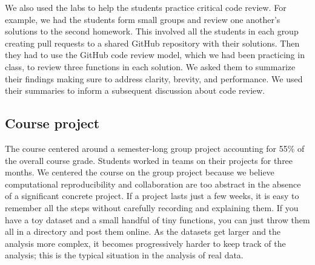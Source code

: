 We also used the labs to help the students practice critical code review.
For example, we had the students form small groups and review one another's
solutions to the second homework.
This involved all the students in each group creating pull requests to a
shared GitHub repository with their solutions.
Then they had to use the GitHub code review model, which we had been practicing
in class, to review three functions in each solution.
We asked them to summarize their findings making sure to address
clarity, brevity, and performance.
We used their summaries to inform a subsequent discussion about code review.

\subsection{Course project}\label{project}

The course centered around a semester-long group project accounting for 55\%
of the overall course grade.
Students worked in teams on their projects for three months.
We centered the course on the group project because we believe computational
reproducibility and collaboration are too abstract in the absence of a
significant concrete project.
If a project lasts just a few weeks, it is easy to remember all the steps
without carefully recording and explaining them.
If you have a toy dataset and a small handful of tiny functions, you can just
throw them all in a directory and post them online.  As the datasets get
larger and the analysis more complex, it becomes progressively harder to keep
track of the analysis; this is the typical situation in the analysis of real
data.


